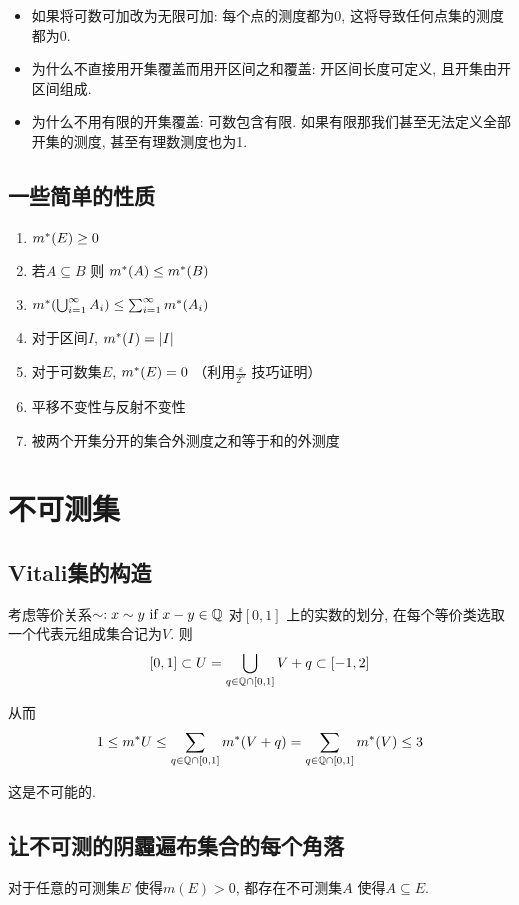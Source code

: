 \begin{itemize}
    \item 如果将可数可加改为无限可加: 每个点的测度都为0, 这将导致任何点集的测度都为0.
    \item 为什么不直接用开集覆盖而用开区间之和覆盖: 开区间长度可定义, 且开集由开区间组成.
    \item 为什么不用有限的开集覆盖: 可数包含有限. 如果有限那我们甚至无法定义全部开集的测度, 甚至有理数测度也为1.
\end{itemize}

\subsection{一些简单的性质}
\begin{enumerate}
    \item \(m^{*}(E)\geq 0\)
    \item 若\(A \subseteq B\) 则 \(m^{*}(A) \leq m^{*}(B)\)
    \item \(m^{*}(\bigcup_{i=1}^{\infty} A_{i}) \leq
        \sum_{i=1}^{\infty} m^{*}(A_{i})\)
    \item 对于区间\(I\), \(m^{*}(I) = |I|\)
    \item 对于可数集\(E\), \(m^{*}(E) = 0\)
        （利用\(\frac{\varepsilon}{2^{n}}\) 技巧证明）
    \item 平移不变性与反射不变性
    \item 被两个开集分开的集合外测度之和等于和的外测度

\end{enumerate}

\section{不可测集}

\subsection{Vitali集的构造}
考虑等价关系\(\sim: x\sim y \text{ if } x-y \in \mathbb{Q}\) 对\([0,1]\)
上的实数的划分, 在每个等价类选取一个代表元组成集合记为\(V\). 则\[
    [0,1] \subset U=\bigcup_{q \in \mathbb{Q}\cap[0,1]} V+q \subset [-1,2]
\]

从而\[
    1\leq m^{*} U \leq \sum_{q \in \mathbb{Q}\cap[0,1]} m^{*}(V+q) = \sum_{q \in
    \mathbb{Q}\cap[0,1]} m^{*}(V) \leq 3
\]

这是不可能的.

\subsection{让不可测的阴霾遍布集合的每个角落}
\begin{theorem}
    对于任意的可测集\(E\) 使得\(m(E)>0\), 都存在不可测集\(A\) 使得\(A \subseteq E\).
\end{theorem}


